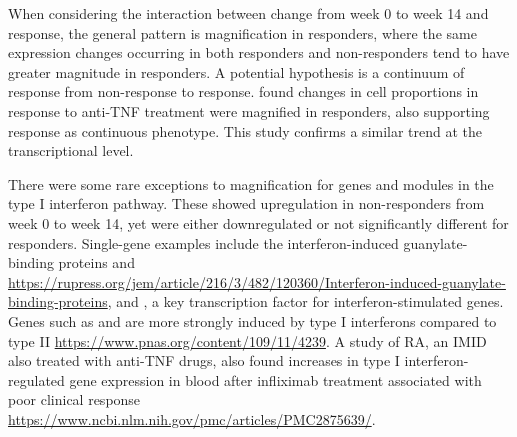 \begin{outline}
When considering the interaction between change from week 0 to week 14 and response,
the general pattern is magnification in responders,
where the same expression changes occurring in both responders and non-responders tend to have greater magnitude in responders.
A potential hypothesis is a continuum of response from non-response to response.
\textcite{gaujoux2019CellcentredMetaanalysisReveals} found changes in cell proportions in response to anti-\gls{TNF} treatment were magnified in responders, 
also supporting response as continuous phenotype.
This study confirms a similar trend at the transcriptional level.


There were some rare exceptions to magnification for genes and modules in the type I interferon pathway.
These showed upregulation in non-responders from week 0 to week 14,
yet were either downregulated or not significantly different for responders.
Single-gene examples include the interferon-induced guanylate-binding proteins  and  \url{https://rupress.org/jem/article/216/3/482/120360/Interferon-induced-guanylate-binding-proteins}, 
and , a key transcription factor for interferon-stimulated genes\autocite{schneider2014InterferonStimulatedGenesComplex}.
Genes such as  and  are more strongly induced by type I interferons compared to type II \url{https://www.pnas.org/content/109/11/4239}.
A study of \gls{RA},
an \gls{IMID} also treated with anti-\gls{TNF} drugs,
also found increases in type I interferon-regulated gene expression in blood after infliximab treatment associated with poor clinical response \url{https://www.ncbi.nlm.nih.gov/pmc/articles/PMC2875639/}.


\end{outline}
